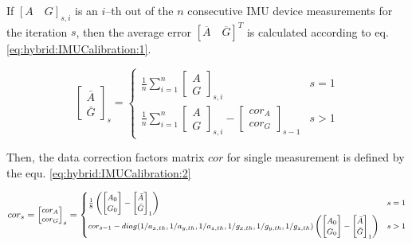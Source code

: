 \documentclass[sensors,article,submit,moreauthors,pdftex,10pt,a4paper]{mdpi}
\begin{document}
	If $[A\quad G]_{s,i}$ is an $i$--th out of the $n$ consecutive IMU device measurements for the iteration $s$, then the average error $[\overline{A}\quad \overline{G}]^T$ is calculated according to eq. \ref{eq:hybrid:IMUCalibration:1}.
	
	\begin{equation}
		\begin{bmatrix} \bar{A} \\ \bar{G} \end{bmatrix}_s =
		\begin{cases}
			\frac{1}{n}\sum_{i=1}^{n}{\begin{bmatrix}A \\ G\end{bmatrix}_{s,i}} & s = 1\\
			\frac{1}{n}\sum_{i=1}^{n}{\begin{bmatrix}A \\ G\end{bmatrix}_{s,i} - \begin{bmatrix}cor_A\\ cor_G\end{bmatrix}_{s-1}} &  s > 1
		\end{cases}
		\label{eq:hybrid:IMUCalibration:1}
	\end{equation}

	Then, the data correction factors matrix $cor$ for single measurement is defined by the equ. \ref{eq:hybrid:IMUCalibration:2}
	
	\begin{equation}
		\footnotesize
		cor_s = \begin{bmatrix}cor_A\\ cor_G\end{bmatrix}_s =
		\begin{cases}
			\frac{1}{8}\left(\begin{bmatrix}A_0                                                                          \\ G_0\end{bmatrix} - \begin{bmatrix}\bar{A}\\ \bar{G}\end{bmatrix}_1\right) & s = 1\\
			cor_{s-1} - diag(1/a_{x,th},1/a_{y,th},1/a_{z,th},1/g_{x,th},1/g_{y,th},1/g_{z,th}) \left(\begin{bmatrix}A_0 \\ G_0\end{bmatrix} - \begin{bmatrix}\bar{A}\\ \bar{G}\end{bmatrix}_1\right) & s > 1
		\end{cases}
		\label{eq:hybrid:IMUCalibration:2}
	\end{equation}	
	
\end{document}
